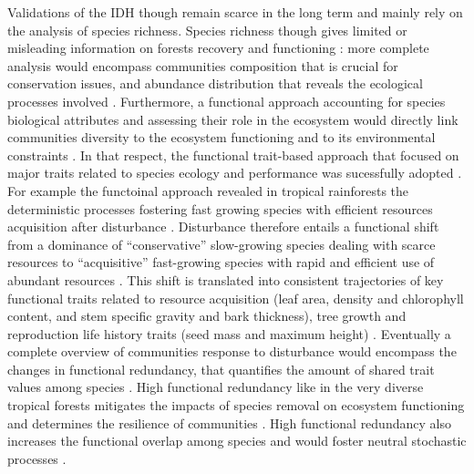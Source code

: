 \documentclass[fleqn,10pt]{ArtEcoFoG} %
\theoremstyle{definition}
\theoremstyle{definition}
\theoremstyle{definition}
\theoremstyle{remark}
\begin{document}
Validations of the IDH though remain scarce in the long term and mainly
rely on the analysis of species richness. Species richness though gives
limited or misleading information on forests recovery and functioning
\citep{Martin2015, Chaudhary2016}: more complete analysis would
encompass communities composition that is crucial for conservation
issues, and abundance distribution that reveals the ecological processes
involved \citep{Magurran1988, Lavorel2002, Bellwood2006}. Furthermore, a
functional approach accounting for species biological attributes and
assessing their role in the ecosystem would directly link communities
diversity to the ecosystem functioning and to its environmental
constraints
\citep{Violle2007b, Moretti2009, Baraloto2012a, Scheiter2013}. In that
respect, the functional trait-based approach that focused on major
traits related to species ecology and performance was sucessfully
adopted \citep{Diaz2005, Villeger2008a}. For example the functoinal
approach revealed in tropical rainforests the deterministic processes
fostering fast growing species with efficient resources acquisition
after disturbance \citep{Molino2001, Haddad2008, Ruger2009}. Disturbance
therefore entails a functional shift from a dominance of
``conservative'' slow-growing species dealing with scarce resources to
``acquisitive'' fast-growing species with rapid and efficient use of
abundant resources \citep{TerSteege2001, Reich2014, Herault2011}. This
shift is translated into consistent trajectories of key functional
traits related to resource acquisition (leaf area, density and
chlorophyll content, and stem specific gravity and bark thickness), tree
growth and reproduction life history traits (seed mass and maximum
height) \citep{Wright2004, TerSteege2006, Westoby2006a, Chave2009b}.
Eventually a complete overview of communities response to disturbance
would encompass the changes in functional redundancy, that quantifies
the amount of shared trait values among species \citep{Carmona2016}.
High functional redundancy like in the very diverse tropical forests
\citep{Bellwood2006} mitigates the impacts of species removal on
ecosystem functioning and determines the resilience of communities
\citep{Trenbath1999, Elmqvist2003, Diaz2005}. High functional redundancy
also increases the functional overlap among species and would foster
neutral stochastic processes \citep{Gravel2006}.
\end{document}
